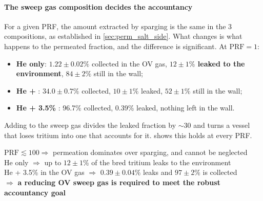 \documentclass[a4paper,11pt,oneside]{report}
\newenvironment{keyresult}
  {\begin{tcolorbox}[colback=blue!5, colframe=blue!50!black, boxrule=0.5pt, arc=2pt]}
  {\end{tcolorbox}}
\begin{document}
\paragraph{The sweep gas composition decides the accountancy}
For a given PRF, the amount extracted by sparging is the same in the 3 compositions, as established in \cref{sec:perm_salt_side}. What changes is what happens to the permeated fraction, and the difference is significant. At $\mathrm{PRF}=1$:
\begin{itemize}
    \item \textbf{He only}: $1.22\pm0.02\%$ collected in the OV gas, \textbf{$12\pm1\%$ leaked to the environment}, $84\pm2\%$ still in the wall;
    \item \textbf{He + }: $34.0\pm0.7\%$ collected, $10\pm1\%$ leaked, $52\pm1\%$ still in the wall;
    \item \textbf{He + 3.5\% }: 96.7\% collected, 0.39\% leaked, nothing left in the wall.
\end{itemize}
Adding  to the sweep gas divides the leaked fraction by $\sim30$ and turns a vessel that loses tritium into one that accounts for it.  shows this holds at every PRF.

\begin{keyresult}
    \centering
    $\mathrm{PRF}\lesssim100 \Rightarrow$ permeation dominates over sparging, and cannot be neglected \\
    He only $\Rightarrow$ up to $12\pm1\%$ of the bred tritium leaks to the environment \\
    He + 3.5\%  in the OV gas $\Rightarrow$ $0.39\pm0.04\%$ leaks and $97\pm2\%$ is collected \\
    $\Rightarrow$ \textbf{a reducing OV sweep gas is required to meet the robust accountancy goal}
\end{keyresult}
\end{document}

